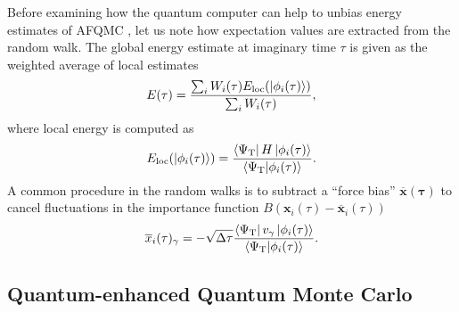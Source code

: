 \documentclass[../main.tex]{subfiles}
\begin{document}
Before examining how the quantum computer can help to unbias energy estimates of AFQMC \cite{huggins2022unbiasing}, let us note how expectation values are extracted from the random walk. The global energy estimate at imaginary time $\tau$ is given as the weighted average of local estimates
\begin{equation}\label{eq:globalenergy}
    E(\tau) = \frac{\sum_i W_i (\tau) E_{\mathrm{loc}}(\ket{\phi_i(\tau)})}{\sum_i W_i (\tau)},
\end{equation} where local energy is computed as
\begin{equation}\label{eq:localenergy}
    E_{\mathrm{loc}} (\ket{\phi_i(\tau)}) = \frac{\bra{\Psi_\mathrm{T}} H \ket{\phi_i(\tau)}}{\braket{\Psi_\mathrm{T}}{\phi_i(\tau)}}. 
\end{equation} A common procedure in the random walks is to subtract a  ``force bias'' $\bm{\overline{x}(\tau)}$ to cancel fluctuations in the importance function $B(\bm{x}_i(\tau) - \bm{\overline{x}}_i(\tau))$ \cite{motta2018ab}
\begin{equation}\label{eq:forcebias}
    \overline{x}_i(\tau)_\gamma = - \sqrt{\Delta \tau} \frac{\bra{\Psi_\mathrm{T}} v_\gamma \ket{\phi_i(\tau)}}{\braket{\Psi_\mathrm{T}}{\phi_i(\tau)}}.
\end{equation}

\subsection{Quantum-enhanced Quantum Monte Carlo}
\end{document}
